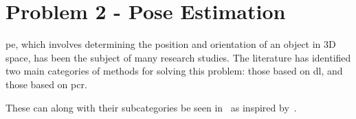 






\section{Problem 2 - Pose Estimation}\label{sec:lit-rev-problem-2}

\gls{pe}, which involves determining the position and orientation of an object in 3D space, has been the subject of many research studies. The literature has identified two main categories of methods for solving this problem: those based on \gls{dl}, and those based on \gls{pcr}. \medskip

These can along with their subcategories be seen in~ as inspired by~\cite{a-comprehensive-survey-on-point-cloud-registration}.


